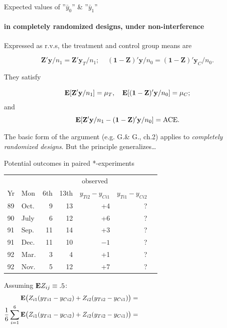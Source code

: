 \begin{frame}{Expected values of ''$\bar{y}_{0}$'' \& ''$\bar{y}_{1}$''}
\framesubtitle{in completely randomized designs, under non-interference}

Expressed as r.v.s, the  treatment and control group means are 

$$\mathbf{Z}'\mathbf{y}/n_{1} =  \mathbf{Z}'\mathbf{y}_{T}/n_{1};\,
\quad (\mathbf{1} - \mathbf{Z})'\mathbf{y}/n_{0} =  (\mathbf{1} -\mathbf{Z})'\mathbf{y}_{C}/n_{0} .$$   

They satisfy 

$$\mathbf{E} [\mathbf{Z}'\mathbf{y}/n_{1} ] = \mu_{T},  \quad \mathbf{E}[
(\mathbf{1} - \mathbf{Z})'\mathbf{y}/n_{0} ] = \mu_{C}; $$
and 
$$\mathbf{E}[
\mathbf{Z}'\mathbf{y}/n_{1} - (\mathbf{1} - \mathbf{Z})'\mathbf{y}/n_{0}] = \mathrm{ACE}. $$

The basic form of the argument (e.g. G.\& G., ch.2) applies to
\textit{completely randomized designs}. But the principle generalizes\ldots
\end{frame}

\begin{frame}{Potential outcomes in paired *-experiments}
  
\begin{tabular}{ll|rrrrr} \hline
 &  & \multicolumn{4}{c}{observed} \\
Yr & Mon &   6th &	13th&$y_{Ti2} -y_{Ci1}$ &$y_{Ti1} -y_{Ci2}$\\ \hline
89 & Oct. &	9 &	13  & +4 & ? \\
90 & July &	6 &	12  & +6 & ? \\
91 & Sep. &   11  &	14   & +3 & ?\\
91 & Dec. &   11 &	10  & $-1$& ? \\
92 & Mar. &	3 &	4    & +1& ?\\
92 & Nov. &	5 &	12  & +7& ? \\ \hline
\end{tabular}
\medskip

Assuming $\mathbf{E} Z_{ij} \equiv .5 $:\\
\begin{align*}
\EE \big( Z_{i1}(y_{Ti1} -y_{Ci2}) + Z_{i2}(y_{Ti2} - y_{Ci1} )
  \big) &=\hspace{.5\linewidth}  \\
\frac{1}{6} \sum_{i=1}^6 \EE \big( Z_{i1}(y_{Ti1} -y_{Ci2}) + Z_{i2}(y_{Ti2} - y_{Ci1} ) \big)  &= \\  
\end{align*}
\end{frame}

